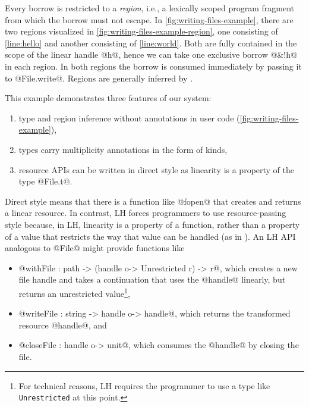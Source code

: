 Every borrow is restricted to a \emph{region}, i.e., a lexically
scoped program fragment from which the borrow must not escape. In
\cref{fig:writing-files-example}, there are two regions visualized in \cref{fig:writing-files-example-region}, one 
consisting of \cref{line:hello} and another consisting of
\cref{line:world}. Both are fully contained in the scope of the linear
handle @h@, hence we can take one exclusive borrow @&!h@ in each
region. In both regions the borrow is consumed immediately by passing
it to @File.write@. Regions are generally inferred by \lang.

This example demonstrates three features of our system:
\begin{enumerate}
\item type and region inference without annotations in user code (\cref{fig:writing-files-example}),
\item types carry multiplicity annotations in the form of kinds,
\item resource APIs can be written in direct style as linearity is a
  property of the type @File.t@.
\end{enumerate}

Direct style means that there is a function like @fopen@ that creates
and returns a linear resource. In contrast, LH forces programmers to
use resource-passing style because, in LH, linearity is a property of
a function, rather than a property of a value that restricts the way
that value can be handled (as in \lang). An LH API analogous to @File@
might provide functions like
\begin{itemize}
\item @withFile : path -> (handle o-> Unrestricted r) -> r@, which creates a new
  file handle and takes a continuation that uses the @handle@
  linearly, but returns an unrestricted value\footnote{For technical
    reasons, LH  requires the programmer to use a type like
    \lstinline/Unrestricted/ at this  point.},
\item @writeFile : string -> handle o-> handle@, which
  returns the transformed resource @handle@, and
\item @closeFile : handle o-> unit@, which consumes the @handle@ by
  closing the file.
\end{itemize}

